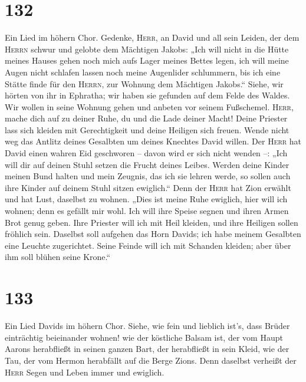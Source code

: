 \hypertarget{section-131}{%
\section{132}\label{section-131}}

 Ein Lied im höhern Chor. Gedenke, \textsc{Herr}, an David
und all sein Leiden,  der dem \textsc{Herrn} schwur und
gelobte dem Mächtigen Jakobs:  „Ich will nicht in die
Hütte meines Hauses gehen noch mich aufs Lager meines Bettes legen,
 ich will meine Augen nicht schlafen lassen noch meine
Augenlider schlummern,  bis ich eine Stätte finde für den
\textsc{Herrn}, zur Wohnung dem Mächtigen Jakobs.`` 
Siehe, wir hörten von ihr in Ephratha; wir haben sie gefunden auf dem
Felde des Waldes.  Wir wollen in seine Wohnung gehen und
anbeten vor seinem Fußschemel.  \textsc{Herr}, mache dich
auf zu deiner Ruhe, du und die Lade deiner Macht!  Deine
Priester lass sich kleiden mit Gerechtigkeit und deine Heiligen sich
freuen.  Wende nicht weg das Antlitz deines Gesalbten um
deines Knechtes David willen.  Der \textsc{Herr} hat
David einen wahren Eid geschworen -- davon wird er sich nicht wenden --:
„Ich will dir auf deinen Stuhl setzen die Frucht deines Leibes.
 Werden deine Kinder meinen Bund halten und mein Zeugnis,
das ich sie lehren werde, so sollen auch ihre Kinder auf deinem Stuhl
sitzen ewiglich.``  Denn der \textsc{Herr} hat Zion
erwählt und hat Lust, daselbst zu wohnen.  „Dies ist
meine Ruhe ewiglich, hier will ich wohnen; denn es gefällt mir wohl.
 Ich will ihre Speise segnen und ihren Armen Brot genug
geben.  Ihre Priester will ich mit Heil kleiden, und ihre
Heiligen sollen fröhlich sein.  Daselbst soll aufgehen
das Horn Davids; ich habe meinem Gesalbten eine Leuchte zugerichtet.
 Seine Feinde will ich mit Schanden kleiden; aber über
ihm soll blühen seine Krone.``

\hypertarget{section-132}{%
\section{133}\label{section-132}}

 Ein Lied Davids im höhern Chor. Siehe, wie fein und
lieblich ist's, dass Brüder einträchtig beieinander wohnen!
 wie der köstliche Balsam ist, der vom Haupt Aarons
herabfließt in seinen ganzen Bart, der herabfließt in sein Kleid,
 wie der Tau, der vom Hermon herabfällt auf die Berge
Zions. Denn daselbst verheißt der \textsc{Herr} Segen und Leben immer
und ewiglich.

